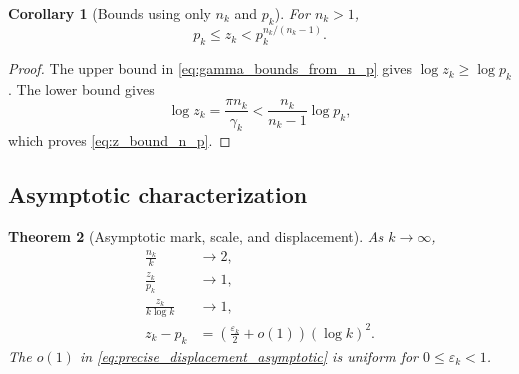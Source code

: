 \documentclass[11pt]{amsart}
\numberwithin{equation}{section}
\theoremstyle{plain}
\newtheorem{theorem}{Theorem}[section]
\newtheorem{corollary}[theorem]{Corollary}
\theoremstyle{definition}
\theoremstyle{remark}
\begin{document}
\begin{corollary}[Bounds using only $n_k$ and $p_k$]
\label{cor:n_p_bounds_z}
For $n_k>1$,
\begin{equation}
 p_k\leq z_k<p_k^{n_k/(n_k-1)}.
 \label{eq:z_bound_n_p}
\end{equation}
\end{corollary}

\begin{proof}
The upper bound in \eqref{eq:gamma_bounds_from_n_p} gives
$\log z_k\geq\log p_k$.  The lower bound gives
\begin{equation}
 \log z_k
 =\frac{\pi n_k}{\gamma_k}
 <\frac{n_k}{n_k-1}\log p_k,
 \label{eq:proof_n_p_upper}
\end{equation}
which proves \eqref{eq:z_bound_n_p}.
\end{proof}

\subsection{Asymptotic characterization}
\label{subsec:asymptotic_characterization}

\begin{theorem}[Asymptotic mark, scale, and displacement]
\label{thm:asymptotic_characterization}
As $k\to\infty$,
\begin{align}
 \frac{n_k}{k}&\longrightarrow2,
 \label{eq:nk_over_k_limit}
 \\
 \frac{z_k}{p_k}&\longrightarrow1,
 \label{eq:zk_over_pk_limit}
 \\
 \frac{z_k}{k\log k}&\longrightarrow1,
 \label{eq:zk_scale_limit}
 \\
 z_k-p_k
 &=\left(\frac{\varepsilon_k}{2}+o(1)\right)(\log k)^2.
 \label{eq:precise_displacement_asymptotic}
\end{align}
The $o(1)$ in \eqref{eq:precise_displacement_asymptotic} is uniform for
$0\leq\varepsilon_k<1$.
\end{theorem}
\end{document}
